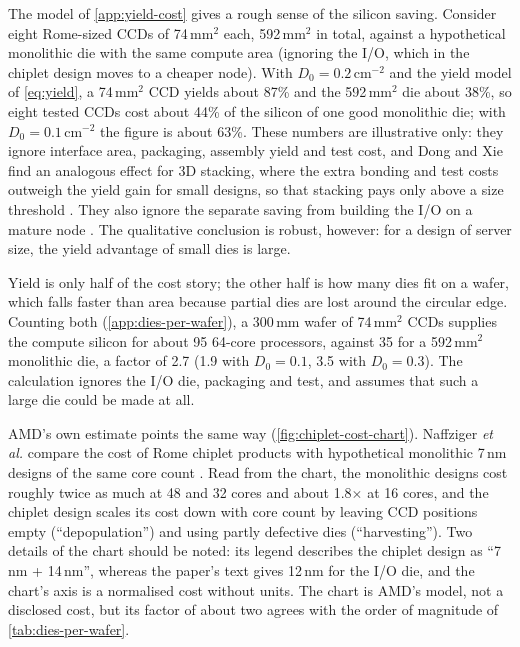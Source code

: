 The model of \cref{app:yield-cost} gives a rough sense of the silicon saving. Consider eight Rome-sized CCDs of 74\,mm$^2$ each, 592\,mm$^2$ in total, against a hypothetical monolithic die with the same compute area (ignoring the I/O, which in the chiplet design moves to a cheaper node). With $D_0 = 0.2$\,cm$^{-2}$ and the yield model of \cref{eq:yield}, a 74\,mm$^2$ CCD yields about 87\% and the 592\,mm$^2$ die about 38\%, so eight tested CCDs cost about 44\% of the silicon of one good monolithic die; with $D_0 = 0.1$\,cm$^{-2}$ the figure is about 63\%. These numbers are illustrative only: they ignore interface area, packaging, assembly yield and test cost, and Dong and Xie find an analogous effect for 3D stacking, where the extra bonding and test costs outweigh the yield gain for small designs, so that stacking pays only above a size threshold \cite{dongSystemlevelCostAnalysis2009}. They also ignore the separate saving from building the I/O on a mature node \cite{naffziger2020chiplet}. The qualitative conclusion is robust, however: for a design of server size, the yield advantage of small dies is large.

Yield is only half of the cost story; the other half is how many dies fit on a wafer, which falls faster than area because partial dies are lost around the circular edge. Counting both (\cref{app:dies-per-wafer}), a 300\,mm wafer of 74\,mm$^2$ CCDs supplies the compute silicon for about 95 64-core processors, against 35 for a 592\,mm$^2$ monolithic die, a factor of 2.7 (1.9 with $D_0 = 0.1$, 3.5 with $D_0 = 0.3$). The calculation ignores the I/O die, packaging and test, and assumes that such a large die could be made at all.

AMD's own estimate points the same way (\cref{fig:chiplet-cost-chart}). Naffziger \emph{et al.} compare the cost of Rome chiplet products with hypothetical monolithic 7\,nm designs of the same core count \cite[Fig.~2.2.2]{naffziger2020chiplet}. Read from the chart, the monolithic designs cost roughly twice as much at 48 and 32 cores and about 1.8$\times$ at 16 cores, and the chiplet design scales its cost down with core count by leaving CCD positions empty (``depopulation'') and using partly defective dies (``harvesting''). Two details of the chart should be noted: its legend describes the chiplet design as ``7\,nm + 14\,nm'', whereas the paper's text gives 12\,nm for the I/O die, and the chart's axis is a normalised cost without units. The chart is AMD's model, not a disclosed cost, but its factor of about two agrees with the order of magnitude of \cref{tab:dies-per-wafer}.

